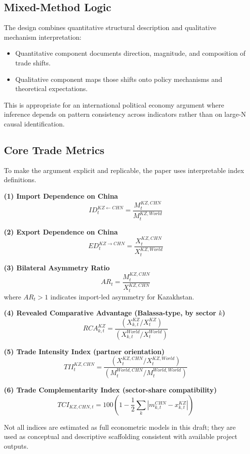 \documentclass[12pt]{article}
\begin{document}
\subsection{Mixed-Method Logic}
The design combines quantitative structural description and qualitative mechanism interpretation:
\begin{itemize}
\item Quantitative component documents direction, magnitude, and composition of trade shifts.
\item Qualitative component maps those shifts onto policy mechanisms and theoretical expectations.
\end{itemize}

This is appropriate for an international political economy argument where inference depends on pattern consistency across indicators rather than on large-N causal identification.

\subsection{Core Trade Metrics}
To make the argument explicit and replicable, the paper uses interpretable index definitions.

\textbf{(1) Import Dependence on China}
\[
ID_t^{KZ\leftarrow CHN}=\frac{M_t^{KZ,CHN}}{M_t^{KZ,World}}
\]

\textbf{(2) Export Dependence on China}
\[
ED_t^{KZ\rightarrow CHN}=\frac{X_t^{KZ,CHN}}{X_t^{KZ,World}}
\]

\textbf{(3) Bilateral Asymmetry Ratio}
\[
AR_t=\frac{M_t^{KZ,CHN}}{X_t^{KZ,CHN}}
\]
where $AR_t>1$ indicates import-led asymmetry for Kazakhstan.

\textbf{(4) Revealed Comparative Advantage (Balassa-type, by sector $k$)}
\[
RCA_{k,t}^{KZ}=\frac{\left(X_{k,t}^{KZ}/X_t^{KZ}\right)}{\left(X_{k,t}^{World}/X_t^{World}\right)}
\]

\textbf{(5) Trade Intensity Index (partner orientation)}
\[
TII_t^{KZ,CHN}=\frac{\left(X_t^{KZ,CHN}/X_t^{KZ,World}\right)}{\left(M_t^{World,CHN}/M_t^{World,World}\right)}
\]

\textbf{(6) Trade Complementarity Index (sector-share compatibility)}
\[
TCI_{KZ,CHN,t}=100\left(1-\frac{1}{2}\sum_k\left|m_{k,t}^{CHN}-x_{k,t}^{KZ}\right|\right)
\]

Not all indices are estimated as full econometric models in this draft; they are used as conceptual and descriptive scaffolding consistent with available project outputs.
\end{document}
